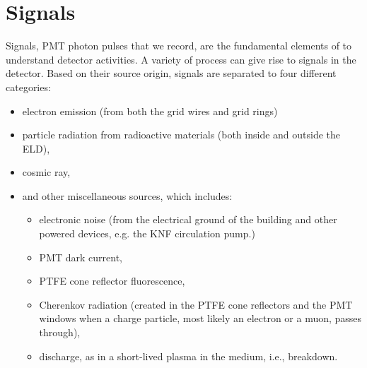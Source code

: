 \section{Signals}
\label{sec:events}
Signals, PMT photon pulses that we record, are the fundamental elements of to understand detector activities. A variety of process can give rise to signals in the detector. Based on their source origin, signals are separated to four different categories:
\begin{itemize}
	\item electron emission (from both the grid wires and grid rings)
	\item particle radiation from radioactive materials (both inside and outside the ELD),
	\item cosmic ray,
	\item and other miscellaneous sources, which includes: 
	\begin{itemize}
		\item electronic noise (from the electrical ground of the building and other powered devices, e.g. the KNF circulation pump.)
		\item PMT dark current, 
		\item PTFE cone reflector fluorescence, 
		\item Cherenkov radiation (created in the PTFE cone reflectors and the PMT windows when a charge particle, most likely an electron or a muon, passes through),
		\item discharge, as in a short-lived plasma in the medium, i.e., breakdown.
	\end{itemize}
\end{itemize}

